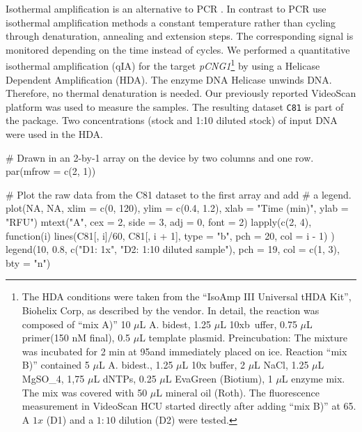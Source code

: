 Isothermal amplification is an alternative to PCR \citep{rodiger_nucleic_2014}. 
In contrast to PCR use isothermal amplification methods a constant temperature 
rather than cycling through denaturation, annealing and extension steps. The 
corresponding signal is monitored depending on the time instead of cycles. We 
performed a quantitative isothermal amplification (qIA) for the target 
\textit{pCNG1}\footnote{The HDA conditions were taken from the ``IsoAmp III 
Universal tHDA Kit'', Biohelix Corp, as described by the vendor. In detail, the 
reaction was composed of ``mix A)'' 10 $\mu$L A. bidest, 1.25 $\mu$L 
10xb~uffer, 
0.75 $\mu$L primer(150 nM final), 0.5 $\mu$L template plasmid. Preincubation: 
The mixture was incubated for 2 min at 95\textcelsius and immediately placed on 
ice. Reaction ``mix B)'' contained 5 $\mu$L A. bidest., 1.25 $\mu$L 10x buffer, 
2 $\mu$L NaCl, 1.25 $\mu$L MgSO_{4}, 1,75 $\mu$L dNTPs, 0.25 $\mu$L EvaGreen 
(Biotium), 1 $\mu$L enzyme mix. The mix was covered with 50 $\mu$L mineral oil 
(Roth). The fluorescence measurement in VideoScan HCU started directly after 
adding ``mix B)'' at 65\textcelsius. A $1x$ (D1) and a $1:10$ dilution (D2) 
were 
tested.} by using a Helicase Dependent Amplification (HDA). The enzyme DNA 
Helicase unwinds DNA. Therefore, no thermal denaturation is needed. Our 
previously reported VideoScan platform \citep{rodiger_highly_2013} was used 
to measure the samples. The resulting dataset \texttt{C81} is part of the 
 package. Two concentrations (stock and 1:10 diluted stock) of 
input DNA were used in the HDA.

\begin{example}
# Drawn in an 2-by-1 array on the device by two columns and one row.
par(mfrow = c(2, 1))

# Plot the raw data from the C81 dataset to the first array and add
# a legend.
plot(NA, NA, xlim = c(0, 120), ylim = c(0.4, 1.2), xlab = "Time (min)", ylab = 
"RFU")
mtext("A", cex = 2, side = 3, adj = 0, font = 2)
lapply(c(2, 4), function(i) {
    lines(C81[, i]/60, C81[, i + 1], type = "b", pch = 20, col = i - 1)
})
legend(10, 0.8, c("D1: 1x", "D2: 1:10 diluted sample"), pch = 19, col = c(1, 
3), 
    bty = "n")
\end{example}


